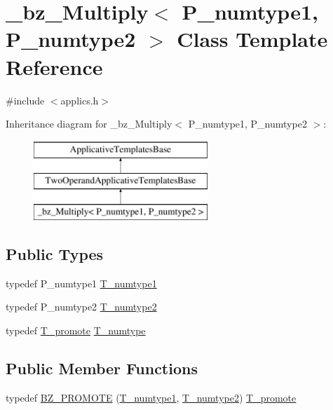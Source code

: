 \hypertarget{class__bz__Multiply}{}\section{\+\_\+bz\+\_\+\+Multiply$<$ P\+\_\+numtype1, P\+\_\+numtype2 $>$ Class Template Reference}
\label{class__bz__Multiply}


{\ttfamily \#include $<$applics.\+h$>$}

Inheritance diagram for \+\_\+bz\+\_\+\+Multiply$<$ P\+\_\+numtype1, P\+\_\+numtype2 $>$\+:\begin{figure}[H]
\begin{center}
\leavevmode
\includegraphics[height=3.000000cm]{class__bz__Multiply}
\end{center}
\end{figure}
\subsection*{Public Types}
\begin{DoxyCompactItemize}
\item 
typedef P\+\_\+numtype1 \hyperlink{class__bz__Multiply_a5db2c816998dace3c8fbbbc273ffbb7c}{T\+\_\+numtype1}
\item 
typedef P\+\_\+numtype2 \hyperlink{class__bz__Multiply_ac3ca14bee71464d93b6681b7d8ac6a33}{T\+\_\+numtype2}
\item 
typedef \hyperlink{minmax_8h_aaa88a440c2f0d00798d5b1d42c79308d}{T\+\_\+promote} \hyperlink{class__bz__Multiply_a073d2c4aa1a34756dc04db37be793928}{T\+\_\+numtype}
\end{DoxyCompactItemize}
\subsection*{Public Member Functions}
\begin{DoxyCompactItemize}
\item 
typedef \hyperlink{class__bz__Multiply_a4973ef4f45d11cf886643c510545e582}{B\+Z\+\_\+\+P\+R\+O\+M\+O\+T\+E} (\hyperlink{class__bz__Multiply_a5db2c816998dace3c8fbbbc273ffbb7c}{T\+\_\+numtype1}, \hyperlink{class__bz__Multiply_ac3ca14bee71464d93b6681b7d8ac6a33}{T\+\_\+numtype2}) \hyperlink{minmax_8h_aaa88a440c2f0d00798d5b1d42c79308d}{T\+\_\+promote}
\end{DoxyCompactItemize}

